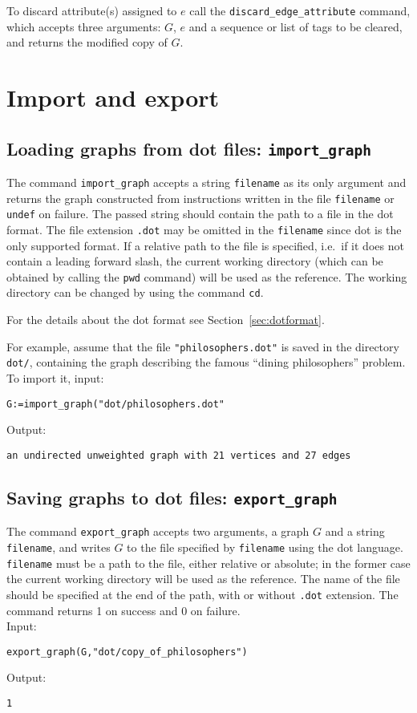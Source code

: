 \documentclass[a4paper,11pt]{article}
\begin{document}
To discard attribute(s) assigned to $ e $ call the {\tt discard\_edge\_attribute} command, which accepts three arguments: $ G $, $ e $ and a sequence or list of tags to be cleared, and returns the modified copy of $ G $.

\section{Import and export}

\subsection{Loading graphs from {\sf dot} files: {\tt import\_graph}}

The command {\tt import\_graph} accepts a string {\tt filename} as its only argument and returns the graph constructed from instructions written in the file {\tt filename} or {\tt undef} on failure. The passed string should contain the path to a file in the {\sf dot} format. The file extension {\tt .dot} may be omitted in the {\tt filename} since {\sf dot} is the only supported format. If a relative path to the file is specified, i.e.~if it does not contain a leading forward slash, the current working directory (which can be obtained by calling the {\tt pwd} command) will be used as the reference. The working directory can be changed by using the command {\tt cd}.

For the details about the {\sf dot} format see Section~\ref{sec:dotformat}.

For example, assume that the file {\tt "philosophers.dot"} is saved in the directory {\tt dot/}, containing the graph describing the famous ``dining philosophers'' problem. To import it, input:
\begin{center}
  \tt G:=import\_graph("dot/philosophers.dot"
\end{center}
Output:
\begin{center}
  \tt an undirected unweighted graph with 21 vertices and 27 edges
\end{center}

\subsection{Saving graphs to {\sf dot} files: {\tt export\_graph}}

The command {\tt export\_graph} accepts two arguments, a graph $ G $ and a string {\tt filename}, and writes $ G $ to the file specified by {\tt filename} using the {\sf dot} language. {\tt filename} must be a path to the file, either relative or absolute; in the former case the current working directory will be used as the reference. The name of the file should be specified at the end of the path, with or without {\tt .dot} extension. The command returns 1 on success and 0 on failure.\\
Input:
\begin{center}
  \tt export\_graph(G,"dot/copy\_of\_philosophers")
\end{center}
Output:
\begin{center}
  \tt 1
\end{center}
\end{document}
